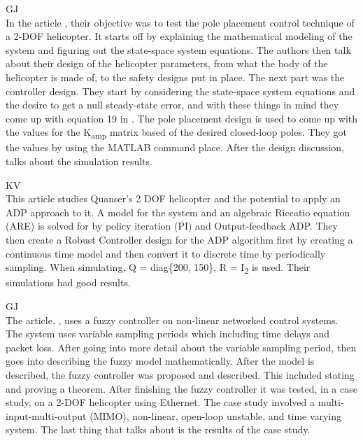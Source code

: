 \documentclass[fontsize=11pt, %
                             paper=letter, %
                             openany, %
                             captions=tableheading,
                             index=totoc,
                             hyperref]{labbook}
\begin{document}
\begin{addmargin}[0cm]{0cm}
GJ\\
In the article \cite{Article3}, their objective was to test the pole placement control technique of a 2-DOF helicopter.  It starts off by explaining the mathematical modeling of the system and figuring out the state-space system equations.  The authors then talk about their design of the helicopter parameters, from what the body of the helicopter is made of, to the safety designs put in place.  The next part was the controller design.  They start by considering the state-space system equations and the desire to get a null steady-state error, and with these things in mind they come up with equation 19 in \cite{Article3}.  The pole placement design is used to come up with the values for the K\textsubscript{amp} matrix based of the desired closed-loop poles.  They got the values by using the MATLAB command place.  After the design discussion, \cite{Article3} talks about the simulation results.

KV\\
This article \cite{Article4} studies Quanser's 2 DOF helicopter and the potential to apply an ADP approach to it.  A model for the system and an algebraic Riccatio equation (ARE) is solved for by policy iteration (PI) and Output-feedback ADP.  They then create a Robust Controller design for the ADP algorithm first by creating a continuous time model and then convert it to discrete time by periodically sampling.  When simulating, Q = diag\{200, 150\}, R = I\textsubscript{2} is used.  Their simulations had good results.

GJ\\
The article, \cite{Article5}, uses a fuzzy controller on non-linear networked control systems.  The system uses variable sampling periods which including time delays and packet loss.  After going into more detail about the variable sampling period, \cite{Article5} then goes into describing the fuzzy model mathematically.  After the model is described, the fuzzy controller was proposed and described.  This included stating and proving a theorem.  After finishing the fuzzy controller it was tested, in a case study, on a 2-DOF helicopter using Ethernet.  The case study involved a multi-input-multi-output (MIMO), non-linear, open-loop unstable, and time varying system.  The last thing that \cite{Article5} talks about is the results of the case study.


\end{addmargin}
\end{document}
